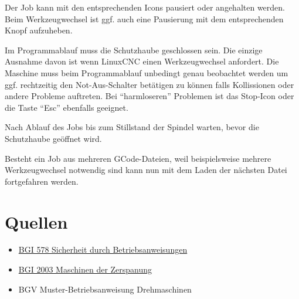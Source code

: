 \documentclass{\basedir/fablab-document}
\begin{document}
Der Job kann mit den entsprechenden Icons pausiert oder angehalten werden. Beim Werkzeugwechsel ist ggf. auch eine Pausierung mit dem entsprechenden Knopf aufzuheben.

Im Programmablauf muss die Schutzhaube geschlossen sein. Die einzige Ausnahme davon ist wenn LinuxCNC einen Werkzeugwechsel anfordert. Die Maschine muss beim Programmablauf unbedingt genau beobachtet werden um ggf. rechtzeitig den Not-Aus-Schalter betätigen zu können falls Kollissionen oder andere Probleme auftreten. Bei \enquote{harmloseren} Problemen ist das Stop-Icon oder die Taste \enquote{Esc} ebenfalls geeignet.

Nach Ablauf des Jobs bis zum Stillstand der Spindel warten, bevor die Schutzhaube geöffnet wird.

Besteht ein Job aus mehreren GCode-Dateien, weil beispielsweise mehrere Werkzeugwechsel notwendig sind kann nun mit dem Laden der nächsten Datei fortgefahren werden.

\appendix

\section{Quellen}
\begin{itemize}
 \item \href{http://publikationen.dguv.de/dguv/pdf/10002/bgi578.pdf}{BGI 578 Sicherheit durch Betriebsanweisungen}
 \item \href{http://www.arbeitssicherheit.de/media/pdfs/CCC_1290.pdf}{BGI 2003 Maschinen der Zerspanung}
 \item BGV Muster-Betriebsanweisung Drehmaschinen
\end{itemize}

\end{document}
